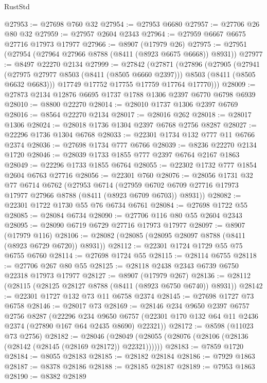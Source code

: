 \begin{lexlean}{RustStd}
\begin{coremodule}
@27953 := @27698 @760 @32
@27954 := @27953 @6680
@27957 := @27706 @26 @80 @32
@27959 := @27957 @2604 @2343
@27964 := @27959 @6667 @6675 @27716 @17973 @17977
@27966 := @8907 (@17979 @26)
@27975 := @27951 (@27954 (@27964 @27966 @8788 (@8411 (@8923 @6675 @6668)) @8931))
@27977 := @8497 @22270 @2134
@27999 := @27842
    (@27871
      (@27896
        (@27905
          (@27941
            (@27975 @27977 @8503 (@8411 (@8505 @6660 @2397)))
            @8503
            (@8411 (@8505 @6632 @6683)))
          @17749
          @17752
          @17755
          @17759
          @17764
          @17770)))
@28009 := @27873 @2134 @12876 @6695 @1737 @1788 @1306 @2397 @6770 @6798 @6939
@28010 := @8800 @22270
@28014 := @28010 @1737 @1306 @2397 @6769
@28016 := @8564 @22270 @2134
@28017 := @28016 @262
@28018 := @28017 @1306
@28024 := @28018 @1736 @1304 @2397 @6768 @2756 @8287
@28027 := @22296 @1736 @1304 @6768
@28033 := @22301 @1734 @132 @777 @11 @6766 @2374
@28036 := @27698 @1734 @777 @6766
@28039 := @8236 @22270 @2134 @1720
@28046 := @28039 @1733 @1855 @777 @2397 @6764 @2167 @1863
@28049 := @22296 @1733 @1855 @6764
@28055 := @22302 @1732 @777 @1854 @2604 @6763 @27716
@28056 := @22301 @760
@28076 := @28056
    @1731
    @32
    @77
    @6714
    @6762
    (@27953
      @6714
      (@27959 @6702 @6709 @27716 @17973 @17977 @27966 @8788 (@8411 (@8923 @6709 @6703)) @8931))
@28082 := @22301 @1722 @1730 @55 @76 @6734 @6761
@28084 := @27698 @1722 @55
@28085 := @28084 @6734
@28090 := @27706 @116 @80 @55 @2604 @2343
@28095 := @28090 @6719 @6729 @27716 @17973 @17977
@28097 := @8907 (@17979 @116)
@28106 := @28082 (@28085 (@28095 @28097 @8788 (@8411 (@8923 @6729 @6720)) @8931))
@28112 := @22301 @1724 @1729 @55 @75 @6755 @6760
@28114 := @27698 @1724 @55
@28115 := @28114 @6755
@28118 := @27706 @267 @80 @55
@28125 := @28118 @2438 @2343 @6739 @6750 @22318 @17973 @17977
@28127 := @8907 (@17979 @267)
@28136 := @28112 (@28115 (@28125 @28127 @8788 (@8411 (@8923 @6750 @6740)) @8931))
@28142 := @22301 @1727 @132 @73 @11 @6758 @2374
@28145 := @27698 @1727 @73 @6758
@28146 := @28017 @73
@28169 := @28146
    @234
    @9650
    @2397
    @6757
    @2756
    @8287
    (@22296
      @234
      @9650
      @6757
      (@22301 @170 @132 @64 @11 @2436 @2374 (@27890 @167 @64 @2435 @8690) @22321))
@28172 := @8598 (@11023 @73 @2756)
@28182 := @28046
    (@28049 (@28055 (@28076 (@28106 (@28136 (@28142 (@28145 (@28169 @28172)) @22321))))))
@28183 := @7859 @1720
@28184 := @8055 @28183
@28185 := @28182 @28184
@28186 := @7929 @1863
@28187 := @8378 @28186
@28188 := @28185 @28187
@28189 := @7953 @1863
@28190 := @8382 @28189

\end{coremodule}
\end{lexlean}
